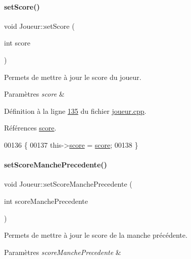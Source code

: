 \paragraph{\texorpdfstring{set\+Score()}{setScore()}}
{\footnotesize\ttfamily void Joueur\+::set\+Score (\begin{DoxyParamCaption}\item[{int}]{score }\end{DoxyParamCaption})}



Permets de mettre à jour le score du joueur. 


\begin{DoxyParams}{Paramètres}
{\em score} & \\
\hline
\end{DoxyParams}


Définition à la ligne \hyperlink{joueur_8cpp_source_l00135}{135} du fichier \hyperlink{joueur_8cpp_source}{joueur.\+cpp}.



Références \hyperlink{joueur_8h_source_l00043}{score}.


\begin{DoxyCode}
00136 \{
00137     this->\hyperlink{class_joueur_a680896b9ff71c2762ae653ef6aa7c8ce}{score} = \hyperlink{class_joueur_a680896b9ff71c2762ae653ef6aa7c8ce}{score};
00138 \}
\end{DoxyCode}
\mbox{\label{class_joueur_aaa6acb88a58bb2af33176e1468ad2107}} 
\paragraph{\texorpdfstring{set\+Score\+Manche\+Precedente()}{setScoreManchePrecedente()}}
{\footnotesize\ttfamily void Joueur\+::set\+Score\+Manche\+Precedente (\begin{DoxyParamCaption}\item[{int}]{score\+Manche\+Precedente }\end{DoxyParamCaption})}



Permets de mettre à jour le score de la manche précédente. 


\begin{DoxyParams}{Paramètres}
{\em score\+Manche\+Precedente} & \\
\hline
\end{DoxyParams}


